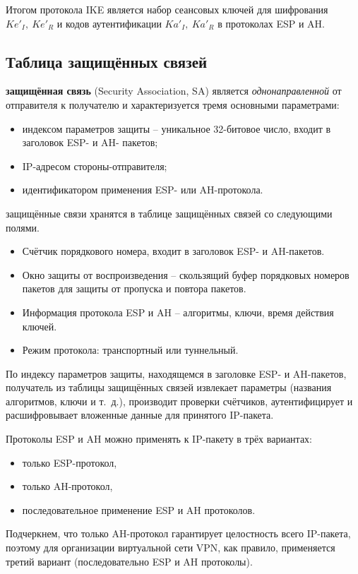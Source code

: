Итогом протокола IKE является набор сеансовых ключей для шифрования $Ke'_I, ~ Ke'_R$ и кодов аутентификации $Ka'_I, ~ Ka'_R$ в протоколах ESP и AH.


\subsection{Таблица защищённых связей}

\textbf{защищённая связь} (Security Association, SA) является \emph{однонаправленной} от отправителя к получателю и характеризуется тремя основными параметрами:
\begin{itemize}
    \item индексом параметров защиты -- уникальное 32-битовое число, входит в заголовок ESP- и AH- пакетов;
    \item IP-адресом стороны-отправителя;
    \item идентификатором применения ESP- или AH-протокола.
\end{itemize}

защищённые связи хранятся в таблице защищённых связей со следующими полями.
\begin{itemize}
    \item Счётчик порядкового номера, входит в заголовок ESP- и AH-пакетов.
    \item Окно защиты от воспроизведения -- скользящий буфер порядковых номеров пакетов для защиты от пропуска и повтора пакетов.
    \item Информация протокола ESP и AH -- алгоритмы, ключи, время действия ключей.
    \item Режим протокола: транспортный или туннельный.
\end{itemize}

По индексу параметров защиты, находящемся в заголовке ESP- и AH-пакетов, получатель из таблицы защищённых связей извлекает параметры (названия алгоритмов, ключи и т.~д.), производит проверки счётчиков, аутентифицирует и расшифровывает вложенные данные для принятого IP-пакета.

Протоколы ESP и AH можно применять к IP-пакету в трёх вариантах:
\begin{itemize}
    \item только ESP-протокол,
     \item только AH-протокол,
    \item последовательное применение ESP и AH протоколов.
\end{itemize}
Подчеркнем, что только AH-протокол гарантирует целостность всего IP-пакета, поэтому для организации виртуальной сети VPN, как правило, применяется третий вариант (последовательно ESP и AH протоколы).


